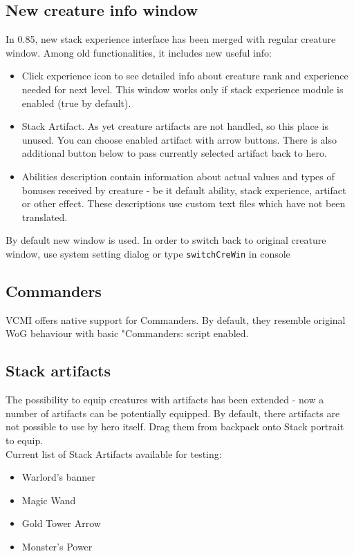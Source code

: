 \documentclass[a4size,final]{article}
\begin{document}
\subsection{New creature info window}
In 0.85, new stack experience interface has been merged with regular creature window. Among old functionalities, it includes new useful info:
\begin{itemize}
\item Click experience icon to see detailed info about creature rank and experience needed for next level. This window works only if stack experience module is enabled (true by default).
\item Stack Artifact. As yet creature artifacts are not handled, so this place is unused. You can choose enabled artifact with arrow buttons. There is also additional button below to pass currently selected artifact back to hero.
\item Abilities description contain information about actual values and types of bonuses received by creature - be it default ability, stack experience, artifact or other effect. These descriptions use custom text files which have not been translated.
\end{itemize}
By default new window is used. In order to switch back to original creature window, use system setting dialog or type \texttt{switchCreWin} in console\\
\label{Commanders}
\subsection{Commanders}
VCMI offers native support for Commanders. By default, they resemble original WoG behaviour with basic "Commanders: script enabled.
\label{Stack_Artifacts}
\subsection{Stack artifacts}
The possibility to equip creatures with artifacts has been extended - now a number of artifacts can be potentially equipped. By default, there artifacts are not possible to use by hero itself. Drag them from backpack onto Stack portrait to equip.\\
Current list of Stack Artifacts available for testing:
\begin{itemize}
\item Warlord's banner
\item Magic Wand
\item Gold Tower Arrow
\item Monster's Power
\end{itemize}
\label{Stack_Queue}
\end{document}
